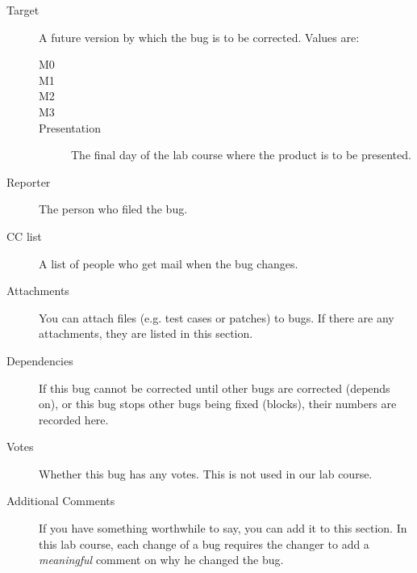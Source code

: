 \documentclass[11pt,handout]{handout}
\begin{document}
\begin{description}
\item[Target]  A future version by which the bug is to be corrected.
  Values are:
  \begin{description}
  \item[M0]
  \item[M1]
  \item[M2]
  \item[M3]
  \item[Presentation]  The final day of the lab course where the product
    is to be presented.
  \end{description}
\item[Reporter]  The person who filed the bug.
\item[CC list]  A list of people who get mail when the bug changes.
\item[Attachments]  You can attach files (e.g. test cases or patches) to
  bugs.  If there are any attachments, they are listed in this section.
\item[Dependencies]  If this bug cannot be corrected until other bugs are
  corrected (depends on), or this bug stops other bugs being fixed (blocks),
  their numbers are recorded here.
\item[Votes]  Whether this bug has any votes.  This is not used in our
  lab course.
\item[Additional Comments]  If you have something worthwhile to say, you
  can add it to this section.  In this lab course, each change of a bug
  requires the changer to add a \emph{meaningful} comment on why he
  changed the bug.
\end{description}
\end{document}

